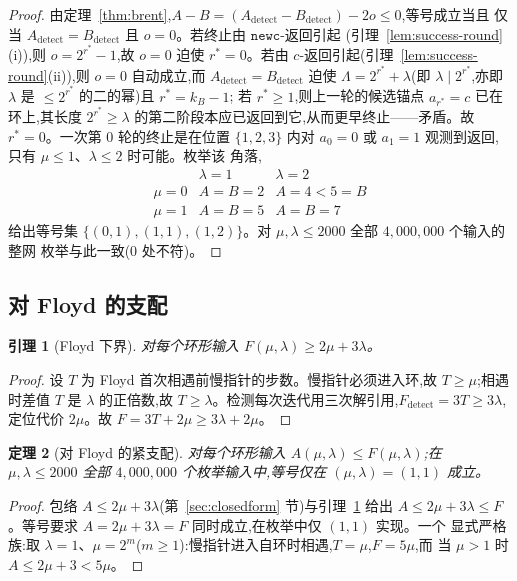 \documentclass[11pt]{ctexart}
\newtheorem{theorem}{定理}[section]
\newtheorem{lemma}[theorem]{引理}
\newcommand{\newc}{\texttt{newc}}
\begin{document}
\begin{proof}
由定理~\ref{thm:brent},$A-B=(A_{\mathrm{detect}}-B_{\mathrm{detect}})-2o\le0$,等号成立当且
仅当 $A_{\mathrm{detect}}=B_{\mathrm{detect}}$ 且 $o=0$。若终止由 $\newc$-返回引起
(引理~\ref{lem:success-round}(i)),则 $o=2^{r^{\ast}}-1$,故 $o=0$ 迫使 $r^{\ast}=0$。若由
$c$-返回引起(引理~\ref{lem:success-round}(ii)),则 $o=0$ 自动成立,而
$A_{\mathrm{detect}}=B_{\mathrm{detect}}$ 迫使 $\Lambda=2^{r^{\ast}}+\lambda$(即
$\lambda\mid 2^{r^{\ast}}$,亦即 $\lambda$ 是 $\le 2^{r^{\ast}}$ 的二的幂)且 $r^{\ast}=k_B-1$;
若 $r^{\ast}\ge1$,则上一轮的候选锚点 $a_{r^{\ast}}=c$ 已在环上,其长度 $2^{r^{\ast}}\ge\lambda$
的第二阶段本应已返回到它,从而更早终止——矛盾。故 $r^{\ast}=0$。一次第 $0$ 轮的终止是在位置
$\{1,2,3\}$ 内对 $a_0=0$ 或 $a_1=1$ 观测到返回,只有 $\mu\le1$、$\lambda\le2$ 时可能。枚举该
角落,
\[
\begin{array}{c|cc}
 & \lambda=1 & \lambda=2\\\hline
\mu=0 & A{=}B{=}2 & A{=}4<5{=}B\\
\mu=1 & A{=}B{=}5 & A{=}B{=}7
\end{array}
\]
给出等号集 $\{(0,1),(1,1),(1,2)\}$。对 $\mu,\lambda\le2000$ 全部 $4{,}000{,}000$ 个输入的整网
枚举与此一致(0 处不符)。
\end{proof}

\subsection{对 Floyd 的支配}

\begin{lemma}[Floyd 下界]
\label{lem:floyd-lower}
对每个环形输入 $F(\mu,\lambda)\ge 2\mu+3\lambda$。
\end{lemma}

\begin{proof}
设 $T$ 为 Floyd 首次相遇前慢指针的步数。慢指针必须进入环,故 $T\ge\mu$;相遇时差值 $T$ 是
$\lambda$ 的正倍数,故 $T\ge\lambda$。检测每次迭代用三次解引用,$F_{\mathrm{detect}}=3T\ge3\lambda$,
定位代价 $2\mu$。故 $F=3T+2\mu\ge3\lambda+2\mu$。
\end{proof}

\begin{theorem}[对 Floyd 的紧支配]
\label{thm:floyd}
对每个环形输入 $A(\mu,\lambda)\le F(\mu,\lambda)$;在 $\mu,\lambda\le2000$ 全部 $4{,}000{,}000$
个枚举输入中,等号仅在 $(\mu,\lambda)=(1,1)$ 成立。
\end{theorem}

\begin{proof}
包络 $A\le2\mu+3\lambda$(第~\ref{sec:closedform} 节)与引理~\ref{lem:floyd-lower} 给出
$A\le2\mu+3\lambda\le F$。等号要求 $A=2\mu+3\lambda=F$ 同时成立,在枚举中仅 $(1,1)$ 实现。一个
显式严格族:取 $\lambda=1$、$\mu=2^m$($m\ge1$):慢指针进入自环时相遇,$T=\mu$,$F=5\mu$,而
当 $\mu>1$ 时 $A\le2\mu+3<5\mu$。
\end{proof}
\end{document}
